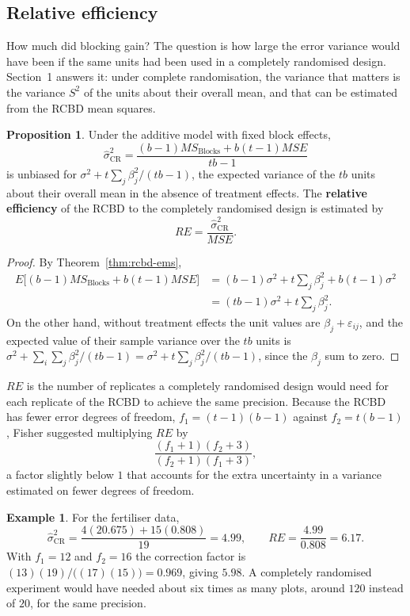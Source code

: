 \documentclass[11pt,a4paper]{article}
\numberwithin{equation}{section}
\theoremstyle{definition}
\newtheorem{exa}[thm]{Example}
\newtheorem{prop}[thm]{Proposition}
\begin{document}
\subsection{Relative efficiency}
How much did blocking gain? The question is how large the error variance would have been if the same units had been used in a completely
randomised design. Section~1 answers it: under complete randomisation, the variance that matters is the variance $S^2$ of the units about their
overall mean, and that can be estimated from the RCBD mean squares.

\begin{prop}\label{prop:relative-efficiency}
Under the additive model with fixed block effects,
\[
\hat\sigma^2_{\mathrm{CR}} = \frac{(b - 1)MS_{\mathrm{Blocks}} + b(t - 1)MSE}{tb - 1}
\]
is unbiased for $\sigma^2 + t\sum_j\beta_j^2/(tb - 1)$, the expected variance of the $tb$ units about their overall mean in the absence of treatment effects. The
\textbf{relative efficiency} of the RCBD to the completely randomised design is estimated by
\[
RE = \frac{\hat\sigma^2_{\mathrm{CR}}}{MSE} .
\]
\end{prop}

\begin{proof}
By Theorem~\ref{thm:rcbd-ems},
\begin{align*}
E\bigl[(b - 1)MS_{\mathrm{Blocks}} + b(t - 1)MSE\bigr] &= (b - 1)\sigma^2 + t\sum_j\beta_j^2 + b(t - 1)\sigma^2 \\
&= (tb - 1)\sigma^2 + t\sum_j\beta_j^2 .
\end{align*}
On the other hand, without treatment effects the unit values are $\beta_j + \varepsilon_{ij}$, and the expected value of their sample variance over the $tb$ units is
$\sigma^2 + \sum_i\sum_j\beta_j^2/(tb - 1) = \sigma^2 + t\sum_j\beta_j^2/(tb - 1)$, since the $\beta_j$ sum to zero.
\end{proof}

$RE$ is the number of replicates a completely randomised design would need for each replicate of the RCBD to achieve the same precision.
Because the RCBD has fewer error degrees of freedom, $f_1 = (t - 1)(b - 1)$ against $f_2 = t(b - 1)$, Fisher suggested multiplying $RE$ by
\[
\frac{(f_1 + 1)(f_2 + 3)}{(f_2 + 1)(f_1 + 3)} ,
\]
a factor slightly below $1$ that accounts for the extra uncertainty in a variance estimated on fewer degrees of freedom.

\begin{exa}
For the fertiliser data,
\[
\hat\sigma^2_{\mathrm{CR}} = \frac{4(20.675) + 15(0.808)}{19} = 4.99 , \qquad RE = \frac{4.99}{0.808} = 6.17 .
\]
With $f_1 = 12$ and $f_2 = 16$ the correction factor is $(13)(19)/\bigl((17)(15)\bigr) = 0.969$, giving $5.98$. A completely randomised experiment would have needed about
six times as many plots, around $120$ instead of $20$, for the same precision.
\end{exa}
\end{document}
